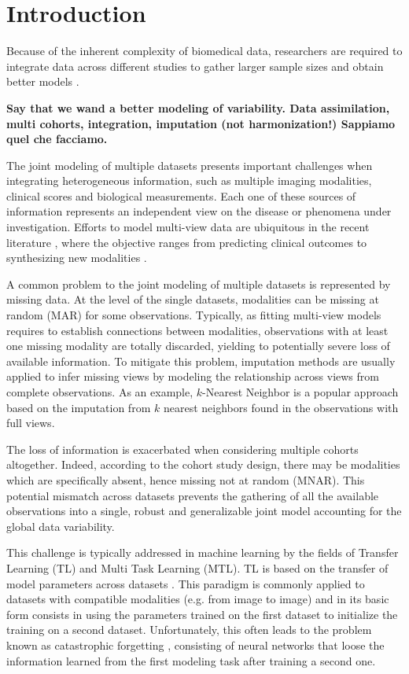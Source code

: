 \section{Introduction}

Because of the inherent complexity of biomedical data,	
researchers are required to integrate data across different studies to gather larger sample sizes and obtain better models \citep{LeSueur2020}.

\textbf{
Say that we wand a better modeling of variability.
Data assimilation, multi cohorts, integration, imputation (not harmonization!)
Sappiamo quel che facciamo.
}

The joint modeling of multiple datasets presents important challenges when integrating heterogeneous information,
such as multiple imaging modalities, clinical scores and biological measurements.
Each one of these sources of information represents an independent view on the disease or phenomena under investigation.
Efforts to model multi-view data are ubiquitous in the recent literature \citep{Vieira2020}, where the objective ranges from predicting clinical outcomes \citep{Chen2019} to synthesizing new modalities \citep{Zhou2020, Wei2019}.

A common problem to the joint modeling of multiple datasets is represented by missing data.
At the level of the single datasets, modalities can be missing at random (MAR) for some observations.
Typically, as fitting multi-view models requires to establish connections between modalities, observations with at least one missing modality are totally discarded, yielding to potentially severe loss of available information.
To mitigate this problem, imputation methods are usually applied to infer missing views by modeling the relationship across views from complete observations.
As an example, $k$-Nearest Neighbor is a popular approach based on the imputation from $k$ nearest neighbors found in the observations with full views.

The loss of information is exacerbated when considering multiple cohorts altogether.
Indeed, according to the cohort study design, there may be modalities which are specifically absent, hence missing not at random (MNAR).
This potential mismatch across datasets prevents the gathering of all the available observations into a single, robust and generalizable joint model accounting for the global data variability.

This challenge is typically addressed in machine learning by the fields of Transfer Learning (TL) and Multi Task Learning (MTL).
TL is based on the transfer of model parameters across datasets \citep{TL}.
This paradigm is commonly applied to datasets with compatible modalities (e.g. from image to image) and in its basic form consists in using the parameters trained on the first dataset to initialize the training on a second dataset.
Unfortunately, this often leads to the problem known as catastrophic forgetting \citep{CatastroficForgetting}, consisting of neural networks that loose the information learned from the first modeling task after training a second one.

